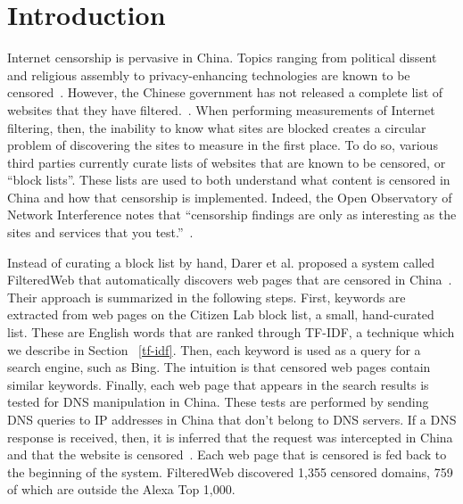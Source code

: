 
\section{Introduction} 

Internet censorship is pervasive in China. Topics ranging from
political dissent and religious assembly to privacy-enhancing
technologies are known to be
censored~\cite{citizenlab:block}. However, the Chinese government has
not released a complete list of websites that they have
filtered.~\cite{fhouse:china}. When performing measurements of
Internet filtering, then, the inability to know what sites are blocked
creates a circular problem of discovering the sites to measure in the
first place. To do so, various third parties currently curate lists of
websites that are known to be censored, or ``block lists''. These
lists are used to both understand {what} content is censored in China
and how that censorship is implemented. Indeed, the Open Observatory
of Network Interference notes that ``censorship findings are only as
interesting as the sites and services that you
test.''~\cite{ooni:lists}.

Instead of curating a block list by hand, Darer et al. proposed a
system called FilteredWeb that automatically discovers web pages that
are censored in China~\cite{darer2017filteredweb}. Their approach is
summarized in the following steps. First, keywords are extracted from
web pages on the Citizen Lab block list, a small, hand-curated
list. These are English words that are ranked through TF-IDF, a
technique which we describe in Section ~\ref{tf-idf}. Then, each
keyword is used as a query for a search engine, such as Bing. The
intuition is that censored web pages contain similar
keywords. Finally, each web page that appears in the search results is
tested for DNS manipulation in China. These tests are performed by
sending DNS queries to IP addresses in China that don't belong to DNS
servers. If a DNS response is received, then, it is inferred that the
request was intercepted in China and that the website is
censored~\cite{darer2017filteredweb, lowe2007great,
levis2012collateral}. Each web page that is censored is fed back to
the beginning of the system. FilteredWeb discovered 1,355 censored
domains, 759 of which are outside the Alexa Top 1,000.

